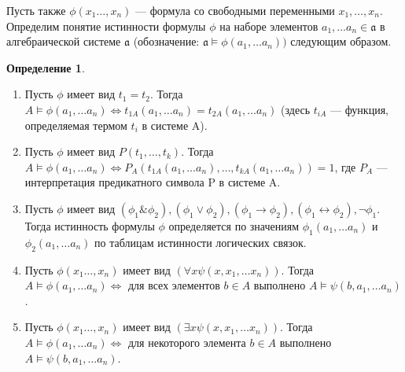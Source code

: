 \documentclass[a4paper]{article}
\theoremstyle{definition}
\newtheorem*{definition}{Определение}
\theoremstyle{remark}
\begin{document}
    Пусть также $\phi(x_1 \dots, x_n)$ — формула со свободными переменными $x_1, \dots, x_n$. Определим 
    понятие истинности формулы $\phi$ на наборе элементов $a_1, \dots a_n \in \mathfrak{a}$ в алгебраической 
    системе $\mathfrak{a}$ (обозначение: $\mathfrak{a} \models \phi(a_1, \dots a_n))$ следующим образом.
    \begin{definition}
        \begin{enumerate}
            \item Пусть $\phi$ имеет вид $t_1 = t_2$. Тогда $A \models \phi(a_1, \dots a_n) \Leftrightarrow t_{1A}(a_1, \dots a_n) = t_{2A}(a_1, \dots a_n)$ (здесь $t_{iA}$ —
            функция, определяемая термом $t_i$ в системе A).
            \item Пусть $\phi$ имеет вид $P(t_1,\dots, t_k)$. Тогда 
            $A \models \phi(a_1, \dots a_n) \Leftrightarrow P_A(t_{1A}(a_1, \dots a_n), \dots, t_{kA}(a_1, \dots a_n)) = 1$, 
            где $P_A$ — интерпретация предикатного символа P в системе A.
            \item Пусть $\phi$ имеет вид $(\phi_1 \& \phi_2), (\phi_1 \vee \phi_2), (\phi_1 \rightarrow \phi_2), (\phi_1 \leftrightarrow \phi_2), \neg\phi_1$. Тогда истинность формулы 
            $\phi$ определяется по значениям $\phi_1(a_1, \dots a_n)$ и $\phi_2(a_1, \dots a_n)$ по таблицам истинности логических 
            связок.
            \item Пусть $\phi(x_1 \dots, x_n)$ имеет вид $(\forall x \psi(x, x_1, \dots x_n))$. Тогда $A \models \phi(a_1, \dots a_n) \Leftrightarrow$ для всех элементов 
            $b \in A$ выполнено $A \models \psi (b, a_1, \dots a_n)$.
            \item Пусть $\phi(x_1 \dots, x_n)$ имеет вид $(\exists x \psi(x, x_1, \dots x_n))$. Тогда $A \models \phi(a_1, \dots a_n) \Leftrightarrow$ для некоторого 
            элемента $b \in A$ выполнено $A \models \psi (b, a_1, \dots a_n)$.
        \end{enumerate}
    \end{definition}
\end{document}

